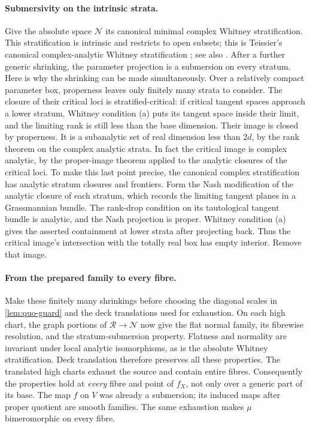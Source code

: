 \paragraph{Submersivity on the intrinsic strata.}
Give the absolute space $\mathcal{N}$ its canonical minimal complex Whitney stratification. This stratification is intrinsic and restricts to open subsets; this is Teissier's canonical complex-analytic Whitney stratification \cite[VI, \S3, Propositions~3.1--3.2]{Teissier1982}; see also \cite[\S4.3, following Theorem~4.13]{GilesFloresTeissier2018}. After a further generic shrinking, the parameter projection is a submersion on every stratum. Here is why the shrinking can be made simultaneously. Over a relatively compact parameter box, properness leaves only finitely many strata to consider. The closure of their critical loci is stratified-critical: if critical tangent spaces approach a lower stratum, Whitney condition (a) puts its tangent space inside their limit, and the limiting rank is still less than the base dimension. Their image is closed by properness. It is a subanalytic set of real dimension less than $2d$, by the rank theorem on the complex analytic strata. In fact the critical image is complex analytic, by the proper-image theorem applied to the analytic closures of the critical loci. To make this last point precise, the canonical complex stratification has analytic stratum closures and frontiers. Form the Nash modification of the analytic closure of each stratum, which records the limiting tangent planes in a Grassmannian bundle. The rank-drop condition on its tautological tangent bundle is analytic, and the Nash projection is proper. Whitney condition (a) gives the asserted containment at lower strata after projecting back. Thus the critical image's intersection with the totally real box has empty interior. Remove that image.

\paragraph{From the prepared family to every fibre.}
Make these finitely many shrinkings before choosing the diagonal scales in \cref{lem:quo-guard} and the deck translations used for exhaustion. On each high chart, the graph portions of $\mathcal{R}\to\mathcal{N}$ now give the flat normal family, its fibrewise resolution, and the stratum-submersion property. Flatness and normality are invariant under local analytic isomorphisms, as is the absolute Whitney stratification. Deck translation therefore preserves all these properties. The translated high charts exhaust the source and contain entire fibres. Consequently the properties hold at \emph{every} fibre and point of $f_X$, not only over a generic part of its base. The map $f$ on $V$ was already a submersion; its induced maps after proper quotient are smooth families. The same exhaustion makes $\mu$ bimeromorphic on every fibre.


